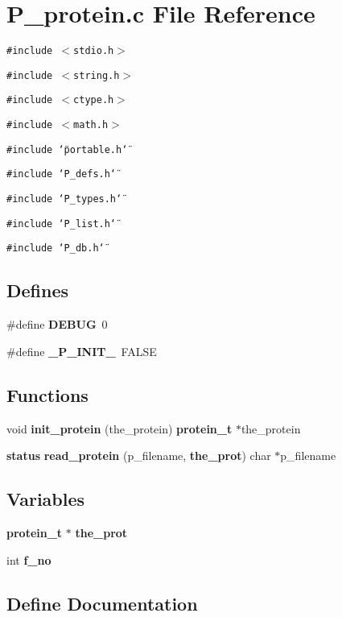 \section{P\_\-protein.c File Reference}
\label{P__protein_8c}
{\tt \#include $<$stdio.h$>$}\par
{\tt \#include $<$string.h$>$}\par
{\tt \#include $<$ctype.h$>$}\par
{\tt \#include $<$math.h$>$}\par
{\tt \#include \char`\"{}portable.h\char`\"{}}\par
{\tt \#include \char`\"{}P\_\-defs.h\char`\"{}}\par
{\tt \#include \char`\"{}P\_\-types.h\char`\"{}}\par
{\tt \#include \char`\"{}P\_\-list.h\char`\"{}}\par
{\tt \#include \char`\"{}P\_\-db.h\char`\"{}}\par
\subsection*{Defines}
\begin{CompactItemize}
\item 
\#define {\bf DEBUG}\ 0
\item 
\#define {\bf \_\-P\_\-INIT\_\-}\ FALSE
\end{CompactItemize}
\subsection*{Functions}
\begin{CompactItemize}
\item 
void {\bf init\_\-protein} (the\_\-protein) {\bf protein\_\-t} $\ast$the\_\-protein
\item 
{\bf status} {\bf read\_\-protein} (p\_\-filename, {\bf the\_\-prot}) char $\ast$p\_\-filename
\end{CompactItemize}
\subsection*{Variables}
\begin{CompactItemize}
\item 
{\bf protein\_\-t} $\ast$ {\bf the\_\-prot}
\item 
int {\bf f\_\-no}
\end{CompactItemize}


\subsection{Define Documentation}
